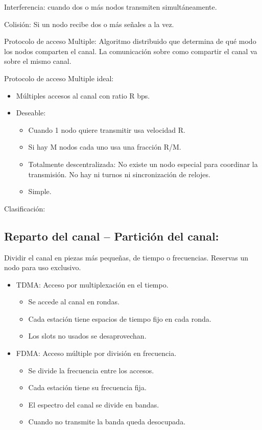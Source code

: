 \documentclass[12pt, twoside, openright]{report} %
\begin{document}
Interferencia: cuando dos o más nodos transmiten simultáneamente.

Colisión: Si un nodo recibe dos o más señales a la vez.

Protocolo de acceso Multiple: Algoritmo distribuido que determina de
qué modo los nodos comparten el canal. La comunicación sobre como
compartir el canal va sobre el mismo canal.

Protocolo de acceso Multiple ideal:

\begin{itemize}
	\item Múltiples accesos al canal con ratio R bps.
	\item Deseable:

	      \begin{itemize}
		      \item Cuando 1 nodo quiere transmitir usa velocidad R.
		      \item Si hay M nodos cada uno usa una fracción R/M.
		      \item Totalmente descentralizada: No existe un nodo especial para
		            coordinar la transmisión. No hay ni turnos ni sincronización de
		            relojes.
		      \item Simple.
	      \end{itemize}
\end{itemize}
\pagebreak

Clasificación:

\subsection{Reparto del canal -- Partición del canal:}
Dividir el canal en
piezas más pequeñas, de tiempo o frecuencias. Reservas un nodo
para uso exclusivo.
\begin{itemize}
	\item TDMA: Acceso por multiplexación en el tiempo.

	      \begin{itemize}
		      \item Se accede al canal en rondas.
		      \item Cada estación tiene espacios de tiempo fijo en cada ronda.
		      \item Los slots no usados se desaprovechan.
	      \end{itemize}
	\item FDMA: Acceso múltiple por división en frecuencia.

	      \begin{itemize}
		      \item Se divide la frecuencia entre los accesos.
		      \item Cada estación tiene su frecuencia fija.
		      \item El espectro del canal se divide en bandas.
		      \item Cuando no transmite la banda queda desocupada.
	      \end{itemize}
\end{itemize}
\end{document}
